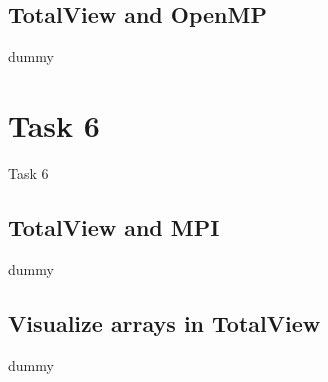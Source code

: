 \documentclass[9pt,pdftex]{beamer}
\begin{document}
\subsection{TotalView and OpenMP}
\begin{frame}dummy\end{frame}

\section{Task 6}
\begin{frame}{Task 6}
\tableofcontents[
  currentsection,
  sectionstyle=show/hide,
  subsectionstyle=show/show/hide
]
\end{frame}
\subsection{TotalView and MPI}
\begin{frame}dummy\end{frame}
\subsection{Visualize arrays in TotalView}
\begin{frame}dummy\end{frame}
\end{document}
